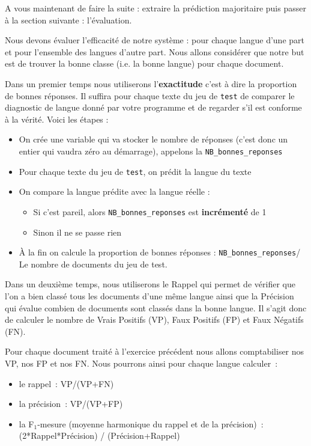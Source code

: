 A vous maintenant de faire la suite : extraire la prédiction majoritaire puis passer à la section suivante : l'évaluation.

\vspace{0.5cm}
\vspace{0.5cm}

 Nous devons évaluer l'efficacité de notre système : pour chaque langue d'une part et pour l'ensemble des langues d'autre part.
 Nous allons considérer que notre but est de trouver la bonne classe (i.e. la bonne langue) pour chaque document.

Dans un premier temps nous utiliserons l'\textbf{exactitude} c'est à dire la proportion de bonnes réponses. Il suffira pour chaque texte du jeu de \texttt{test} de comparer le diagnostic de langue donné par votre programme et de regarder s'il est conforme à la vérité. Voici les étapes :

 \begin{itemize}
 \item On crée une variable qui va stocker le nombre de réponses (c'est donc un entier qui vaudra zéro au démarrage), appelons la \texttt{NB\_bonnes\_reponses}
 \item Pour chaque texte du jeu de \texttt{test}, on prédit la langue du texte
 \item On compare la langue prédite avec la langue réelle :
 \begin{itemize}
 \item Si c'est pareil, alors \texttt{NB\_bonnes\_reponses} est \textbf{incrémenté} de 1
 \item Sinon il ne se passe rien
 \end{itemize}
 \item À la fin on calcule la proportion de bonnes réponses : \texttt{NB\_bonnes\_reponses}/ Le nombre de documents du jeu de test.
 \end{itemize}


Dans un deuxième temps, nous utiliserons le Rappel qui permet de vérifier que l'on a bien classé tous les documents d'une même langue ainsi que la Précision qui évalue combien de documents sont classés dans la bonne langue. 
 Il s'agit donc de calculer le nombre de Vrais Positifs (VP), Faux Positifs (FP) et Faux Négatifs (FN).

Pour chaque document traité à l'exercice précédent nous allons comptabiliser nos VP, nos FP et nos FN.
 Nous pourrons ainsi pour chaque langue calculer :
\begin{itemize}
\item le rappel : VP/(VP+FN)
\item la précision : VP/(VP+FP)
\item la F$_1$-mesure (moyenne harmonique du rappel et de la précision) : (2*Rappel*Précision) / (Précision+Rappel)
\end{itemize}

